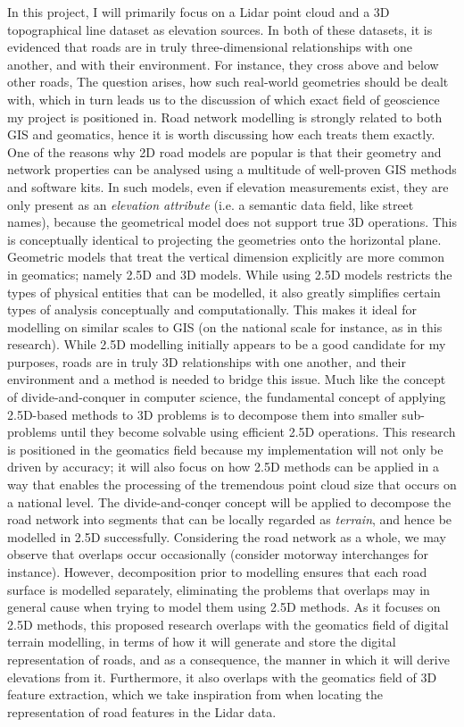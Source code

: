 In this project, I will primarily focus on a Lidar point cloud and a 3D topographical line dataset as elevation sources. In both of these datasets, it is evidenced that roads are in truly three-dimensional relationships with one another, and with their environment. For instance, they cross above and below other roads,  The question arises, how such real-world geometries should be dealt with, which in turn leads us to the discussion of which exact field of geoscience my project is positioned in. Road network modelling is strongly related to both GIS and geomatics, hence it is worth discussing how each treats them exactly. One of the reasons why 2D road models are popular is that their geometry and network properties can be analysed using a multitude of well-proven GIS methods and software kits. In such models, even if elevation measurements exist, they are only present as an \textit{elevation attribute} (i.e. a semantic data field, like street names), because the geometrical model does not support true 3D operations. This is conceptually identical to projecting the geometries onto the horizontal plane. Geometric models that treat the vertical dimension explicitly are more common in geomatics; namely 2.5D and 3D models. While using 2.5D models restricts the types of physical entities that can be modelled, it also greatly simplifies certain types of analysis conceptually and computationally. This makes it ideal for modelling on similar scales to GIS (on the national scale for instance, as in this research). While 2.5D modelling initially appears to be a good candidate for my purposes, roads are in truly 3D relationships with one another, and their environment and a method is needed to bridge this issue. Much like the concept of divide-and-conquer in computer science, the fundamental concept of applying 2.5D-based methods to 3D problems is to decompose them into smaller sub-problems until they become solvable using efficient 2.5D operations. This research is positioned in the geomatics field because my implementation will not only be driven by accuracy; it will also focus on how 2.5D methods can be applied in a way that enables the processing of the tremendous point cloud size that occurs on a national level. The divide-and-conqer concept will be applied to decompose the road network into segments that can be locally regarded as \textit{terrain}, and hence be modelled in 2.5D successfully. Considering the road network as a whole, we may observe that overlaps occur occasionally (consider motorway interchanges for instance). However, decomposition prior to modelling ensures that each road surface is modelled separately, eliminating the problems that overlaps may in general cause when trying to model them using 2.5D methods. As it focuses on 2.5D methods, this proposed research overlaps with the geomatics field of digital terrain modelling, in terms of how it will generate and store the digital representation of roads, and as a consequence, the manner in which it will derive elevations from it. Furthermore, it also overlaps with the geomatics field of 3D feature extraction, which we take inspiration from when locating the representation of road features in the Lidar data.





